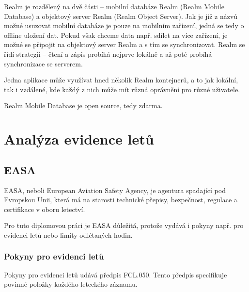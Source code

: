 \documentclass[thesis=M,czech]{FITthesis}[2012/06/26]
\begin{document}
Realm je rozdělený na dvě části -- mobilní databáze Realm (Realm Mobile Database) a objektový server Realm (Realm Object Server). Jak je již z názvů možné usuzovat mobilní databáze je pouze na mobilním zařízení, jedná se tedy o offline uložení dat. Pokud však chceme data např. sdílet na více zařízení, je možné se připojit na objektový server Realm a s tím se synchronizovat. Realm se řídí strategii  -- čtení a zápis probíhá nejprve lokálně a až poté probíhá synchronizace se serverem.

Jedna aplikace může využívat hned několik Realm kontejnerů, a to jak lokální, tak i vzdálené, kde každý z nich může mít různá oprávnění pro různé uživatele.

Realm Mobile Database je open source, tedy zdarma. \cite{realmOverview}

\chapter{Analýza evidence letů}
\section{EASA}
EASA, neboli European Aviation Safety Agency, je agentura spadající pod Evropskou Unii, která má na starosti technické přepisy, bezpečnost, regulace a certifikace v oboru letectví. \cite{EU} 

Pro tuto diplomovou práci je EASA důležitá, protože vydává i pokyny např. pro evidenci letů nebo limity odlétaných hodin. \cite{EASARegulations}

\subsection{Pokyny pro evidenci letů}
Pokyny pro evidenci letů udává předpis FCL.050. Tento předpis specifikuje povinné položky každého leteckého záznamu. \cite{FCL} 
\end{document}
